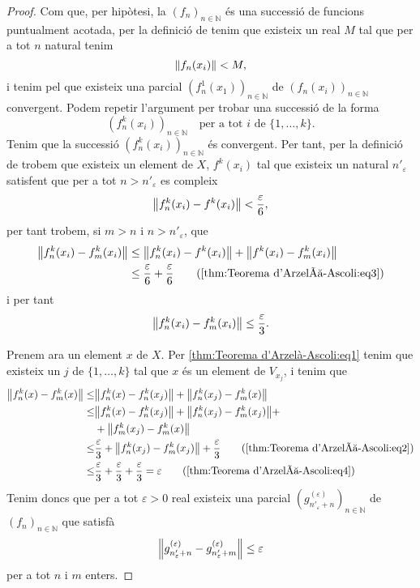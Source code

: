 \documentclass[../../Main.tex]{subfiles}
\begin{document}
\begin{lemma}
\begin{proof}
			Com que, per hipòtesi, la \((f_{n})_{n\in\mathbb{N}}\) és una successió de funcions puntualment acotada, per la definició de  tenim que existeix un real \(M\) tal que per a tot \(n\) natural tenim
			\[
			    \norm{f_{n}(x_{i})}<M,
			\]
			i tenim pel  que existeix una parcial \((f_{n}^{1}(x_{1}))_{n\in\mathbb{N}}\) de \((f_{n}(x_{i}))_{n\in\mathbb{N}}\) convergent.
			Podem repetir l'argument per trobar una successió de la forma
			\[
			    (f^{k}_{n}(x_{i}))_{n\in\mathbb{N}}\quad\text{per a tot }i\text{ de }\{1,\dots,k\}.
			\]
			Tenim que la successió \((f^{k}_{n}(x_{i}))_{n\in\mathbb{N}}\) és convergent.
			Per tant, per la definició de  trobem que existeix un element de \(X\), \(f^{k}(x_{i})\) tal que existeix un natural \(n'_{\varepsilon}\) satisfent que per a tot \(n>n'_{\varepsilon}\) es compleix
			\begin{equation}
				\label{thm:Teorema d'Arzelà-Ascoli:eq3}
				\norm{f^{k}_{n}(x_{i})-f^{k}(x_{i})}<\frac{\varepsilon}{6},
			\end{equation}
			per tant trobem, si \(m>n\) i \(n>n'_{\varepsilon}\), que
			\begin{align*}
				\norm{f^{k}_{n}(x_{i})-f^{k}_{m}(x_{i})}&\leq\norm{f^{k}_{n}(x_{i})-f^{k}(x_{i})}+\norm{f^{k}(x_{i})-f^{k}_{m}(x_{i})} \\
				&\leq\frac{\varepsilon}{6}+\frac{\varepsilon}{6} \tag{\ref{thm:Teorema d'Arzelà-Ascoli:eq3}}
			\end{align*}
			i per tant
			\begin{equation}
				\label{thm:Teorema d'Arzelà-Ascoli:eq4}
				\norm{f^{k}_{n}(x_{i})-f^{k}_{m}(x_{i})}\leq\frac{\varepsilon}{3}.
			\end{equation}
			
			Prenem ara un element \(x\) de \(X\).
			Per \eqref{thm:Teorema d'Arzelà-Ascoli:eq1} tenim que existeix un \(j\) de \(\{1,\dots,k\}\) tal que \(x\) és un element de \(V_{x_{j}}\), i tenim que
			\begin{align*}
				\norm{f^{k}_{n}(x)-f^{k}_{m}(x)}\leq&\norm{f^{k}_{n}(x)-f^{k}_{n}(x_{j})}+\norm{f^{k}_{n}(x_{j})-f^{k}_{m}(x)} \\
				\leq&\norm{f^{k}_{n}(x)-f^{k}_{n}(x_{j})}+\norm{f^{k}_{n}(x_{j})-f^{k}_{m}(x_{j})}+\\&+\norm{f^{k}_{m}(x_{j})-f^{k}_{m}(x)} \\
				\leq&\frac{\varepsilon}{3}+\norm{f^{k}_{n}(x_{j})-f^{k}_{m}(x_{j})}+\frac{\varepsilon}{3}\tag{\ref{thm:Teorema d'Arzelà-Ascoli:eq2}} \\
				\leq&\frac{\varepsilon}{3}+\frac{\varepsilon}{3}+\frac{\varepsilon}{3}=\varepsilon\tag{\ref{thm:Teorema d'Arzelà-Ascoli:eq4}}
			\end{align*}
			Tenim doncs que per a tot \(\varepsilon>0\) real existeix una parcial \((g^{(\varepsilon)}_{n'_{\varepsilon}+n})_{n\in\mathbb{N}}\) de \((f_{n})_{n\in\mathbb{N}}\) que satisfà
			\[
			    \norm{g^{(\varepsilon)}_{n'_{\varepsilon}+n}-g^{(\varepsilon)}_{n'_{\varepsilon}+m}}\leq\varepsilon
			\]
			per a tot \(n\) i \(m\) enters.
			

\end{proof}
\end{lemma}
\end{document}
